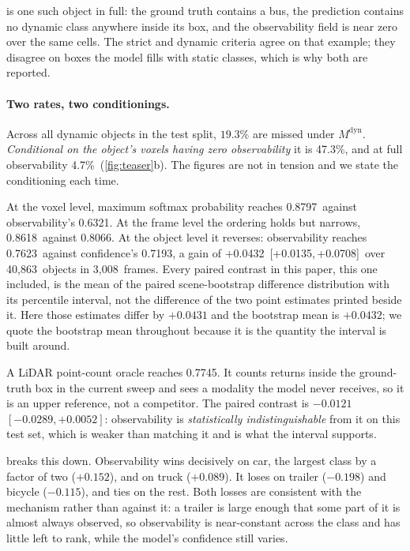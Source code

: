 \documentclass[10pt,twocolumn,letterpaper]{article}
\newcommand{\objObs}{0.7623}
\newcommand{\objMSP}{0.7193}
\newcommand{\objDelta}{+0.0432}
\newcommand{\objDeltaCI}{[+0.0135,\,+0.0708]}
\newcommand{\objOracle}{0.7745}
\newcommand{\voxMSP}{0.8797}
\newcommand{\voxObs}{0.6321}
\newcommand{\frmConf}{0.8618}
\newcommand{\frmObs}{0.8066}
\newcommand{\missHi}{47.3\%}
\newcommand{\missLo}{4.7\%}
\newcommand{\nObj}{40{,}863}
\newcommand{\nFrames}{3{,}008}
\begin{document}
 is one such object in full: the ground truth
contains a bus, the prediction contains no dynamic class anywhere inside
its box, and the observability field is near zero over the same cells. The strict and
dynamic criteria agree on that example; they disagree on boxes the model
fills with static classes, which is why both are reported.

\paragraph{Two rates, two conditionings.} Across all dynamic objects in the
test split, $19.3\%$ are missed under $M^{\text{dyn}}$. \emph{Conditional on
the object's voxels having zero observability} it is \missHi, and at full
observability \missLo\ (\cref{fig:teaser}b). The figures are not in tension
and we state the conditioning each time.

At the voxel level, maximum softmax probability reaches \voxMSP\ against
observability's \voxObs. At the frame level the ordering holds but
narrows, \frmConf\ against \frmObs. At the object level it reverses:
observability reaches \objObs\ against confidence's \objMSP, a gain of
\objDelta\ \objDeltaCI\ over \nObj\ objects in \nFrames\ frames.
Every paired contrast in this paper, this one included, is the mean of the
paired scene-bootstrap difference distribution with its percentile interval,
not the difference of the two point estimates printed beside it. Here those
estimates differ by $+0.0431$ and the bootstrap mean is $+0.0432$; we quote
the bootstrap mean throughout because it is the quantity the interval is
built around.

A LiDAR point-count oracle reaches \objOracle. It counts returns inside the
ground-truth box in the current sweep and sees a modality the model never
receives, so it is an upper reference, not a competitor. The paired contrast
is $-0.0121$ $[-0.0289, +0.0052]$: observability is \emph{statistically
indistinguishable} from it on this test set, which is weaker than matching
it and is what the interval supports.



 breaks this down. Observability wins decisively on
car, the largest class by a factor of two ($+0.152$), and on truck
($+0.089$). It loses on trailer ($-0.198$) and bicycle ($-0.115$), and
ties on the rest. Both losses are consistent with the mechanism rather
than against it: a trailer is large enough that some part of it is almost
always observed, so observability is near-constant across the class and
has little left to rank, while the model's confidence still varies.
\end{document}

